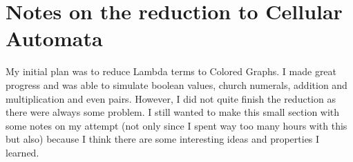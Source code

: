 \documentclass{article}
\begin{document}
\section{Notes on the reduction to Cellular Automata}

My initial plan was to reduce Lambda terms to Colored Graphs.
I made great progress and was able to simulate boolean values, church numerals, addition and multiplication and even pairs.
However, I did not quite finish the reduction as there were always some problem.
I still wanted to make this small section with some notes on my attempt (not only since I spent way too many hours with this but also) because I think there are some interesting ideas and properties I learned.
\end{document}
